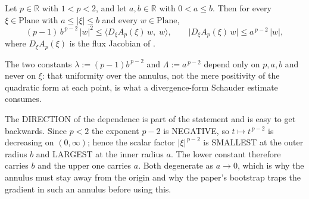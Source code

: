\begin{lemma}
Let $p\in\mathbb{R}$ with $1<p<2$, and let $a,b\in\mathbb{R}$ with $0<a\le b$.  Then for every
$\xi\in\mathrm{Plane}$ with $a\le\lvert\xi\rvert\le b$ and every $w\in\mathrm{Plane}$,
\[
  (p-1)\,b^{\,p-2}\,\lvert w\rvert^{2}
    \le\bigl\langle D_\xi A_p(\xi)\,w,\;w\bigr\rangle,
  \qquad
  \bigl\lvert D_\xi A_p(\xi)\,w\bigr\rvert\le a^{\,p-2}\,\lvert w\rvert ,
\]
where $D_\xi A_p(\xi)$ is the flux Jacobian of .

The two constants $\lambda:=(p-1)b^{\,p-2}$ and $\Lambda:=a^{\,p-2}$ depend only on $p,a,b$ and
never on $\xi$: that uniformity over the annulus, not the mere positivity of the quadratic form
at each point, is what a divergence-form Schauder estimate consumes.

The DIRECTION of the dependence is part of the statement and is easy to get backwards.  Since
$p<2$ the exponent $p-2$ is NEGATIVE, so $t\mapsto t^{\,p-2}$ is decreasing on $(0,\infty)$;
hence the scalar factor $\lvert\xi\rvert^{\,p-2}$ is SMALLEST at the outer radius $b$ and
LARGEST at the inner radius $a$.  The lower constant therefore carries $b$ and the upper one
carries $a$.  Both degenerate as $a\to0$, which is why the annulus must stay away from the
origin and why the paper's bootstrap traps the gradient in such an annulus before using this.
\end{lemma}
